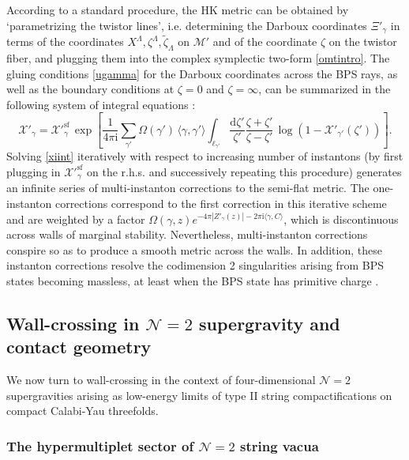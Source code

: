 \documentclass[12pt,reqno]{article}
\numberwithin{equation}{section}
\newcommand{\be}{\begin{equation}}
\newcommand{\ee}{\end{equation}}
\newcommand{\de}{\mathrm{d}}
\newcommand{\I}{\mathrm{i}}
\newcommand{\cM}{\mathcal{M}}
\newcommand{\cN}{\mathcal{N}}
\newcommand{\cX}{\mathcal{X}}
\newcommand{\tzeta}{{\tilde\zeta}}
\def\varpihk{\zeta}
\def\pcM{\cM'}
\def\pXi{\Xi'}
\def\pcX{\cX'}
\def\rigX{X}
\numberwithin{equation}{section}
\begin{document}
According to a standard procedure, the HK metric can be obtained by `parametrizing the twistor lines',
i.e. determining the Darboux coordinates $\pXi_\gamma$ in terms of the
coordinates $\rigX^\Lambda,\zeta^\Lambda,\tzeta_\Lambda$ on $\pcM$ and
of the coordinate $\varpihk$ on the twistor fiber, and plugging them into the complex
symplectic two-form \eqref{omtintro}. The gluing conditions \eqref{ugamma}
for the Darboux coordinates
across the BPS rays, as well as the boundary conditions at $\varpihk=0$ and $\varpihk=\infty$,
can be summarized in the following system of integral equations
\cite{Gaiotto:2008cd,Alexandrov:2009zh}:
\be
\label{xiint}
\pcX_\gamma= \pcX^{\text{sf}}_\gamma\,
\exp\left[\frac{1}{4\pi \I}\sum_{\gamma'} \Omega(\gamma')\, \langle \gamma,\gamma'\rangle
\int_{\ell_{\gamma'} }\frac{\de \varpihk'}{\varpihk'} \frac{\varpihk+\varpihk'}{\varpihk-\varpihk'}
\,\log\left(1-
\pcX_{\gamma'}(\varpihk')\right)\right].
\ee
Solving \eqref{xiint} iteratively with respect to increasing number of instantons
(by first plugging in $\pcX^{\text{sf}}_\gamma$ on the r.h.s. and successively repeating this procedure)
generates an infinite series of multi-instanton corrections to the semi-flat metric.
The one-instanton corrections
correspond to the first correction in this iterative scheme and are weighted by a
factor $\Omega(\gamma,z)e^{-4\pi |Z'_\gamma(z)|-2\pi\I \langle \gamma,C\rangle}$,
which is discontinuous across walls
of marginal stability. Nevertheless, multi-instanton corrections conspire so as to produce
a smooth metric across the walls. In addition, these instanton corrections
resolve the codimension 2 singularities arising from BPS states becoming massless,
at least when the BPS state has primitive charge \cite{Gaiotto:2008cd}.



\subsection{Wall-crossing in $\cN=2$ supergravity and contact geometry}
\label{sec_lifting}

We now turn to wall-crossing in the context of four-dimensional $\cN=2$ supergravities
arising as low-energy limits of type II string compactifications on compact Calabi-Yau threefolds.

\subsubsection{The hypermultiplet sector of $\cN=2$ string vacua}
\end{document}
